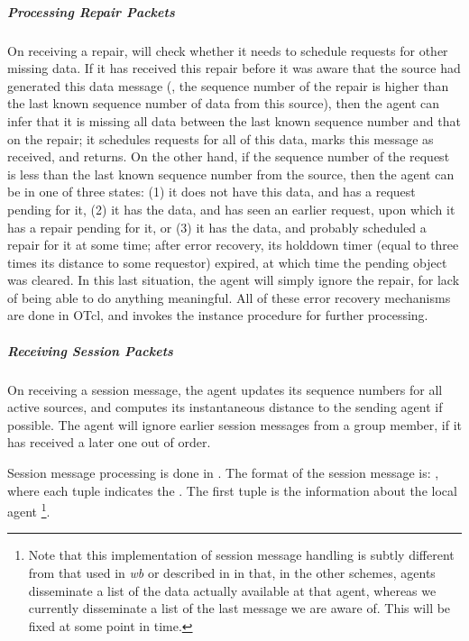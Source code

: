 \documentclass{article}
\begin{document}
\subparagraph{Processing Repair Packets}
On receiving a repair, 
will check whether it needs to schedule requests for other missing data.
If it has received this repair
before it was aware that the source had generated this data message
(\ie, the sequence number of the repair is higher than 
the last known sequence number of data from this source),
then the agent can infer that it is missing all
data between the last known sequence number and that on the repair;
it schedules requests for all of this data,
marks this message as received, and returns.
On the other hand, if the sequence number of the request is less
than the last known sequence number from the source,
then the agent can be in one of three states:
(1) it does not have this data, and has a request pending for it,
(2) it has the data, and has seen an earlier request,
    upon which it has a repair pending for it, or
(3) it has the data, and probably scheduled a repair for it at some time;
    after error recovery, its holddown timer (equal to three times its
    distance to some requestor) expired, at which time the pending object
    was cleared.  In this last situation, the agent will simply ignore
    the repair, for lack of being able to do anything meaningful.
All of these error recovery mechanisms are done in OTcl,
and  invokes the instance procedure
for further processing.

\subparagraph{Receiving Session Packets}
On receiving a session message,
the agent updates its sequence numbers for all active sources,
and computes its instantaneous distance to the sending agent if possible.
The agent will ignore earlier session messages from a group member,
if it has received a later one out of order.

Session message processing is done in
.
The format of the session message is:
,
where each tuple indicates the
.
The first tuple is the information about the local agent%
\footnote{Note that this implementation of session message handling
  is subtly different from that used in \emph{wb} or described in
  \cite{Floy95:Reliable} in that, in the other schemes, agents
  disseminate a list of the data actually available at that agent,
  whereas we currently disseminate a list of the last message we are
  aware of.
  This will be fixed at some point in time.}.
\end{document}
